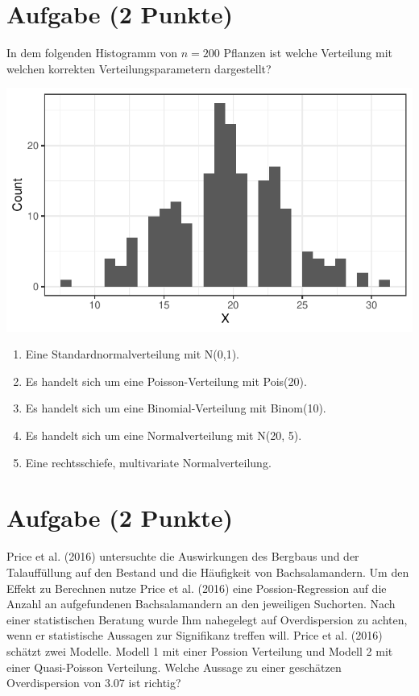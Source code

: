 \documentclass[a4paper, 10pt]{scrartcl}\usepackage[]{graphicx}\usepackage[]{xcolor}
\makeatletter
\def\maxwidth{ %
  \ifdim\Gin@nat@width>\linewidth
    \linewidth
  \else
    \Gin@nat@width
  \fi
}
\makeatother
\begin{document}
\section{Aufgabe \hfill (2 Punkte)}

In dem folgenden Histogramm von $n = 200$ Pflanzen ist welche Verteilung
mit welchen korrekten Verteilungsparametern dargestellt?



{\centering \includegraphics[width=\maxwidth]{img/mc-distribution-02-a-1} 

}







\begin{enumerate}
\item [\textbf{A} \msquare] Eine Standardnormalverteilung mit N(0,1).
\item [\textbf{B} \msquare] Es handelt sich um eine Poisson-Verteilung mit Pois(20).
\item [\textbf{C} \msquare] Es handelt sich um eine Binomial-Verteilung mit Binom(10).
\item [\textbf{D} \msquare] Es handelt sich um eine Normalverteilung mit N(20, 5).
\item [\textbf{E} \msquare] Eine rechtsschiefe, multivariate Normalverteilung.
\end{enumerate}

\section{Aufgabe \hfill (2 Punkte)}




Price et al. (2016) untersuchte die Auswirkungen des Bergbaus und der
Talauff{\"u}llung auf den Bestand und die H{\"a}ufigkeit von Bachsalamandern. Um
den Effekt zu Berechnen nutze Price et al. (2016) eine Possion-Regression
auf die Anzahl an aufgefundenen Bachsalamandern an den jeweiligen
Suchorten. Nach einer statistischen Beratung wurde Ihm nahegelegt auf
Overdispersion zu achten, wenn er statistische Aussagen zur Signifikanz
treffen will. Price et al. (2016) sch{\"a}tzt zwei Modelle. Modell 1 mit einer
Possion Verteilung und Modell 2 mit einer Quasi-Poisson Verteilung. Welche
Aussage zu einer gesch{\"a}tzen Overdispersion von 3.07 ist
richtig?
\end{document}
